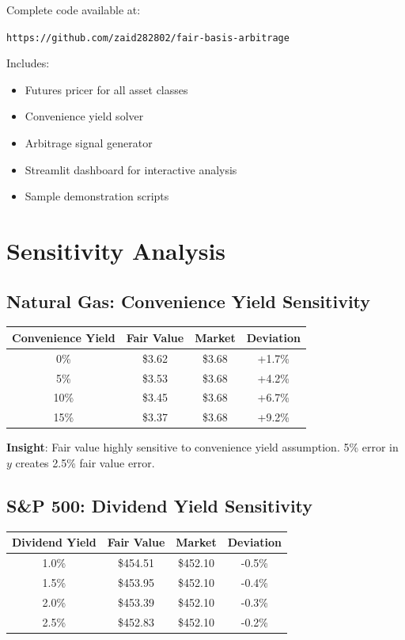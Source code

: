 \documentclass[12pt,a4paper]{article}
\begin{document}
Complete code available at:

\texttt{https://github.com/zaid282802/fair-basis-arbitrage}

Includes:
\begin{itemize}
    \item Futures pricer for all asset classes
    \item Convenience yield solver
    \item Arbitrage signal generator
    \item Streamlit dashboard for interactive analysis
    \item Sample demonstration scripts
\end{itemize}

\section{Sensitivity Analysis}

\subsection{Natural Gas: Convenience Yield Sensitivity}

\begin{table}[H]
\centering
\begin{tabular}{@{}cccc@{}}
\toprule
\textbf{Convenience Yield} & \textbf{Fair Value} & \textbf{Market} & \textbf{Deviation} \\
\midrule
0\% & \$3.62 & \$3.68 & +1.7\% \\
5\% & \$3.53 & \$3.68 & +4.2\% \\
10\% & \$3.45 & \$3.68 & +6.7\% \\
15\% & \$3.37 & \$3.68 & +9.2\% \\
\bottomrule
\end{tabular}
\end{table}

\textbf{Insight}: Fair value highly sensitive to convenience yield assumption. 5\% error in $y$ creates 2.5\% fair value error.

\subsection{S\&P 500: Dividend Yield Sensitivity}

\begin{table}[H]
\centering
\begin{tabular}{@{}cccc@{}}
\toprule
\textbf{Dividend Yield} & \textbf{Fair Value} & \textbf{Market} & \textbf{Deviation} \\
\midrule
1.0\% & \$454.51 & \$452.10 & -0.5\% \\
1.5\% & \$453.95 & \$452.10 & -0.4\% \\
2.0\% & \$453.39 & \$452.10 & -0.3\% \\
2.5\% & \$452.83 & \$452.10 & -0.2\% \\
\bottomrule
\end{tabular}
\end{table}
\end{document}
